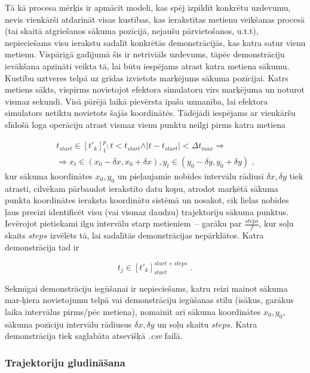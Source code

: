 \documentclass[12pt, a4paper]{article}
\numberwithin{equation}{section} %
\begin{document}
Tā kā procesa mērķis ir apmācīt modeli, kas spēj izpildīt konkrētu uzdevumu, nevis vienkārši atdarināt visas kustības, kas ierakstītas metienu veikšanas procesā (tai skaitā atgriešanos sākuma pozīcijā, nejaušu pārvietošanos, u.t.t), nepieciešams visu ierakstu sadalīt konkrētās demonstrācijās, kas katra satur vienu metienu. Vispārīgā gadījumā šis ir netriviāls uzdevums, tāpēc demonstrāciju ievākšana apzināti veikta tā, lai būtu iespējams atrast katra metiena sākumu. Kustību uztveres telpā uz grīdas izvietots marķējums sākuma pozīcijai. Katrs metiens sākts, vispirms novietojot efektora simulatoru virs marķējuma un noturot vismaz sekundi. Visā pārējā laikā pievērsta īpaša uzmanība, lai efektora simulators netiktu novietots šajās koordinātēs. Tādējādi iespējams ar vienkāršu slīdošā loga operāciju atrast vismaz vienu punktu neilgi pirms katra metiena

\begin{multline}
    t_{start} \in [t'_{k}]^p_1: t < t_{start} \land \vert t - t_{start} \vert < \Delta t_{max} \Rightarrow \\ \Rightarrow x_t \in (x_{0} - \delta x, x_{0} + \delta x ), y_t \in  (y_{0} - \delta y, y_{0} + \delta y )
    \text{ ,}
\end{multline}
kur sākuma koordinātes $x_0, y_0$ un pieļaujamie nobīdes intervālu rādiusi $\delta x, \delta y$ tiek atrasti, cilvēkam pārbaudot ierakstīto datu kopu, atrodot marķētā sākuma punkta koordinātes ieraksta koordinātu sistēmā un nosakot, cik lielas nobīdes ļaus precīzi identificēt visu (vai vismaz daudzu) trajektoriju sākuma punktus. Ievērojot pietiekami ilgu intervālu starp metieniem~-- garāku par $\frac{steps}{f}$, kur soļu skaits $steps$ izvēlēts tā, lai sadalītās demonstrācijas nepārklātos. Katra demonstrācija tad ir 

\begin{equation}
    t_{j} \in [t'_{k}]^{start+steps}_{start}
\text{ .}
\end{equation}

Sekmīgai demonstrāciju iegūšanai ir nepieciešams, katru reizi mainot sākuma mar-ķiera novietojumu telpā vai demonstrāciju iegūšanas stilu (īsākus, garākus laika intervālus pirms/pēc metiena), nomainīt arī sākuma koordinātes $x_0, y_0$, sākuma pozīciju intervālu rādiusus $\delta x, \delta y$ un soļu skaitu $steps$. Katra demonstrācija tiek saglabāta atsevišķā \textit{.csv} failā.

\subsubsection{Trajektoriju gludināšana}
\end{document}
